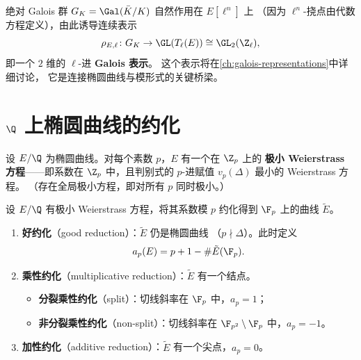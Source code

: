 \begin{remark}
\label{rem:tate-galois}
绝对 Galois 群 $G_K = \Gal(\bar{K}/K)$ 自然作用在 $E[\ell^n]$ 上
（因为 $\ell^n$-挠点由代数方程定义），由此诱导连续表示
\[
  \rho_{E,\ell}\colon G_K \to \GL(T_\ell(E)) \cong \GL_2(\Z_\ell),
\]
即一个 $2$ 维的 $\ell$-进 \textbf{Galois 表示}。
这个表示将在\cref{ch:galois-representations}中详细讨论，
它是连接椭圆曲线与模形式的关键桥梁。
\end{remark}


\section{$\Q$ 上椭圆曲线的约化}
\label{sec:reduction}

\begin{definition}[极小 Weierstrass 方程]
\label{def:minimal-weierstrass}
设 $E/\Q$ 为椭圆曲线。对每个素数 $p$，$E$ 有一个在 $\Z_p$ 上的
\textbf{极小 Weierstrass 方程}——即系数在 $\Z_p$ 中，且判别式的
$p$-进赋值 $v_p(\Delta)$ 最小的 Weierstrass 方程。
（存在全局极小方程，即对所有 $p$ 同时极小。）
\end{definition}

\begin{definition}[约化类型]
\label{def:reduction-type}
设 $E/\Q$ 有极小 Weierstrass 方程，将其系数模 $p$ 约化得到
$\F_p$ 上的曲线 $\tilde{E}$。

\begin{enumerate}
  \item \textbf{好约化}（good reduction）：$\tilde{E}$ 仍是椭圆曲线
    （$p \nmid \Delta$）。此时定义
    \[
      a_p(E) = p + 1 - \#\tilde{E}(\F_p).
    \]
  \item \textbf{乘性约化}（multiplicative reduction）：$\tilde{E}$ 有一个结点。
    \begin{itemize}
      \item \textbf{分裂乘性约化}（split）：切线斜率在 $\F_p$ 中，$a_p = 1$；
      \item \textbf{非分裂乘性约化}（non-split）：切线斜率在 $\F_{p^2} \setminus \F_p$ 中，$a_p = -1$。
    \end{itemize}
  \item \textbf{加性约化}（additive reduction）：$\tilde{E}$ 有一个尖点，$a_p = 0$。
\end{enumerate}
\end{definition}

